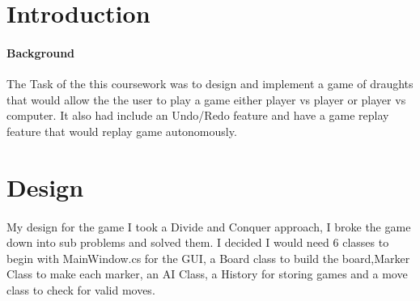 \documentclass[10pt, a4paper]{article}
\title{\mytitle}
\author{\myauthor\hspace{1em}\\\contact\\Edinburgh Napier University\hspace{0.5em}-\hspace{0.5em}\mymodule}
\date{}
\begin{document}
    \maketitle
    \begin{abstract}
       The objective of this coursework was to demonstrate my understanding of Algorithms and Data Structures and apply it to a project. My task was to implement a game of draughts.
    \end{abstract}
    
    
    
    \section{Introduction}
    \paragraph{Background}
    The Task of the this coursework was to design and implement a game of draughts that would allow the the user to play a game either player vs player or player vs computer. It also had include an Undo/Redo feature and have a game replay feature that would replay game autonomously.   
    
   
	
	\section{Design}
\paragraph{}
	My design for the game I took a Divide and Conquer approach, I broke the game down into sub problems and solved them. I decided I would need 6 classes to begin with MainWindow.cs for the GUI, a Board class to build the board,Marker Class to make each marker, an AI Class, a History for storing games and a move class to check for valid moves.
\end{document}
